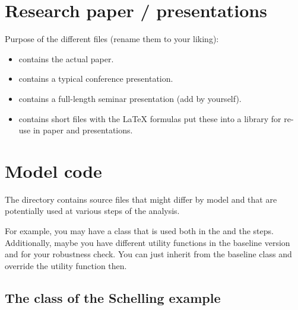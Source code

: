 \documentclass[a4paper,11pt,english]{sphinxmanual}
\begin{document}
\chapter{Research paper / presentations}
\label{\detokenize{paper:research-paper-presentations}}\label{\detokenize{paper:paper}}\label{\detokenize{paper::doc}}
Purpose of the different files (rename them to your liking):
\begin{itemize}
\item {} 
 contains the actual paper.

\item {} 
 contains a typical conference presentation.

\item {} 
 contains a full-length seminar presentation (add by yourself).

\item {} 
 contains short files with the LaTeX formulas \textendash{} put these into a library for re-use in paper and presentations.

\end{itemize}


\chapter{Model code}
\label{\detokenize{model_code:model-code}}\label{\detokenize{model_code:id1}}\label{\detokenize{model_code::doc}}
The directory  contains source files that might differ by model and that are potentially used at various steps of the analysis.

For example, you may have a class that is used both in the {\hyperref[\detokenize{analysis:analysis}]{}} and the {\hyperref[\detokenize{final:final}]{}} steps. Additionally, maybe you have different utility functions in the baseline version and for your robustness check. You can just inherit from the baseline class and override the utility function then.


\section{The  class of the Schelling example}
\label{\detokenize{model_code:module-src.model_code.agent}}\label{\detokenize{model_code:the-agent-class-of-the-schelling-example}}
\end{document}
